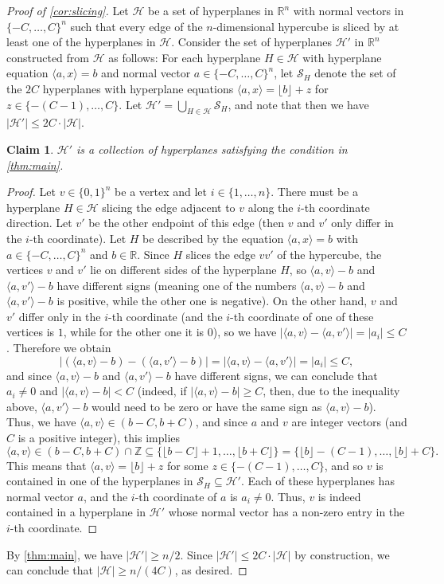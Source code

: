 \documentclass{amsart}
\newtheorem{claim}[theorem]{Claim}
\theoremstyle{remark}
\numberwithin{theorem}{section}
\renewcommand{\(}{\bigl(}
\renewcommand{\)}{\bigr)\vphantom{)}}
\newcommand{\cH}{\mathcal H}
\newcommand{\cS}{\mathcal S}
\renewcommand{\le}{\leqslant}
\renewcommand{\ge}{\geqslant}
\newcommand{\R}{\mathbb R}
\newcommand{\floor}[1]{\lfloor#1\rfloor}
\newcommand{\ang}[1]{\langle#1\rangle}
\newcommand{\bin}{\{0,1\}}
\begin{document}
\begin{proof}[Proof of \cref{cor:slicing}]
Let $\cH$ be a set of hyperplanes in $\mathbb{R}^n$ with normal vectors in $\{-C,\dots, C\}^n$ such that every edge of the $n$-dimensional hypercube is sliced by at least one of the hyperplanes in $\cH$. Consider the set of hyperplanes $\cH'$ in $\mathbb{R}^n$ constructed from $\cH$ as follows: For each hyperplane $H\in \cH$ with hyperplane equation $\ang{a,x} = b $ and normal vector $a\in \{-C,\dots, C\}^n$, let $\cS_H$ denote the set of the $2C$ hyperplanes with hyperplane equations $\ang{a,x} = \floor{b} + z$ for $z\in \{-(C-1),\dots, C\}$. Let $\cH' = \bigcup_{H\in \cH} \cS_H$, and note that then we have $|\cH'| \le 2C\cdot |\cH|$.



\begin{claim}\label{claim:reduction}
    $\cH'$ is a collection of hyperplanes satisfying the condition in \cref{thm:main}.
\end{claim}

\begin{proof}
    Let $v\in \bin^n$ be a vertex and let $i\in \{1,\dots,n\}$. There must be a hyperplane $H\in \cH$ slicing the edge adjacent to $v$ along the $i$-th coordinate direction. Let $v'$ be the other endpoint of this edge (then $v$ and $v'$ only differ in the $i$-th coordinate). Let $H$ be described by the equation $\ang{a,x} = b$  with $a\in \{-C,\dots, C\}^n$ and $b\in \R$. Since $H$ slices the edge $vv'$ of the hypercube, the vertices $v$ and $v'$ lie on different sides of the hyperplane $H$, so $\ang{a,v} - b$ and $\ang{a,v'} - b$ have different signs (meaning one of the numbers $\ang{a,v} - b$ and $\ang{a,v'} - b$ is positive, while the other one is negative). 
    On the other hand, $v$ and $v'$ differ only in the $i$-th coordinate (and the $i$-th coordinate of one of these vertices is $1$, while for the other one it is $0$), so we have $|\ang{a,v}-\ang{a,v'}|=|a_i|\le C$. Therefore we obtain
    \[|(\ang{a,v} - b) - (\ang{a,v'} - b)| = |\ang{a,v}-\ang{a,v'}| =|a_i| \le C,\]
    and since $\ang{a,v} - b$ and $\ang{a,v'} - b$ have different signs, we can conclude that $a_i\ne 0$ and $|\ang{a,v} - b|<C$ (indeed, if $|\ang{a,v} - b|\ge C$, then, due to the inequality above,  $\ang{a,v'} - b$ would need to be zero or have the same sign as $\ang{a,v} - b$). Thus, we have $\ang{a,v}\in (b-C,b+C)$, and since $a$ and $v$ are integer vectors (and $C$ is a positive integer), this implies
    \[\ang{a,v}\in (b-C,b+C)\cap \mathbb{Z}\subseteq \{\floor{b-C}+1,\dots, \floor{b+C}\}=\{\floor{b}-(C-1),\dots, \floor{b}+C\}.\]
    This means that $\ang{a,v}=\floor{b}+z$ for some $z\in \{-(C-1),\dots, C\}$, and so $v$ is contained in one of the hyperplanes in $\cS_H\subseteq \cH'$. Each of these hyperplanes has normal vector $a$, and the $i$-th coordinate of $a$ is $a_i\ne 0$. Thus, $v$ is indeed contained in a hyperplane in $\cH'$ whose normal vector has a non-zero entry in the $i$-th coordinate.
\end{proof}  



By \cref{thm:main}, we have $|\cH'| \ge n/2$. Since $|\cH'|\le 2C\cdot |\cH|$ by construction, we can conclude that $|\cH|\ge n/(4C)$, as desired.
\end{proof}



\printbibliography
\end{document}
